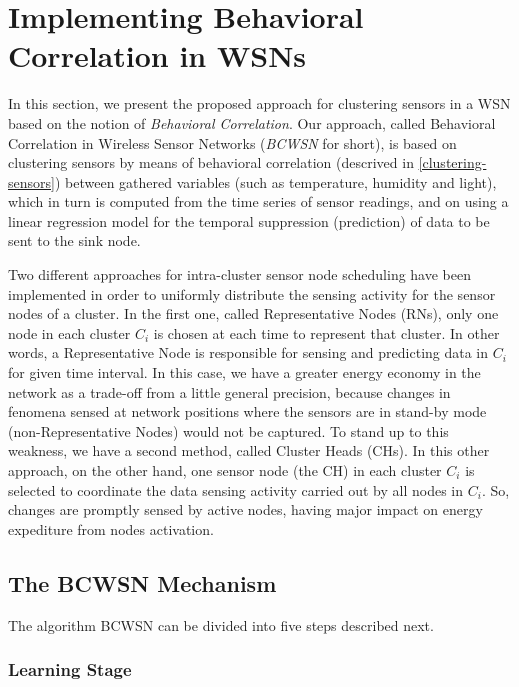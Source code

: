 \documentclass[conference]{IEEEtran}
\begin{document}
\section{Implementing Behavioral Correlation in WSNs}
\label{implementing-bcwsn}

In this section, we present the proposed approach for clustering sensors in a
WSN based on the notion of {\it Behavioral Correlation}. Our approach, called
Behavioral Correlation in Wireless Sensor Networks (\textit{BCWSN} for short),
is based on clustering sensors by means of behavioral correlation (descrived in
\ref{clustering-sensors}) between gathered variables (such as temperature,
humidity and light), which in turn is computed from the time series of sensor
readings, and on using a linear regression model for the temporal
suppression (prediction) of data to be sent to the sink node.

Two different approaches for intra-cluster sensor node scheduling have been
implemented in order to uniformly distribute the sensing activity for the
sensor nodes of a cluster. In the first one, called Representative Nodes (RNs),
only one node in each cluster $C_{i}$ is chosen at each time to represent that
cluster. In other words, a Representative Node is responsible for sensing and
predicting data in $C_{i}$ for given time interval. In this case, we have a
greater energy economy in the network as a trade-off from a little
general precision, because changes in fenomena sensed at network positions where
the sensors are in stand-by mode (non-Representative Nodes) would not be
captured. To stand up to this weakness, we have a second method, called
Cluster Heads (CHs). In this other approach, on the other hand, one sensor node
(the CH) in each cluster $C_{i}$ is selected to coordinate the data sensing
activity carried out by all nodes in $C_{i}$. So, changes are promptly sensed by
active nodes, having major impact on energy expediture from nodes activation.

\subsection{The BCWSN Mechanism}


The algorithm BCWSN can be divided into five steps described next.


\subsubsection{Learning Stage}
\end{document}
